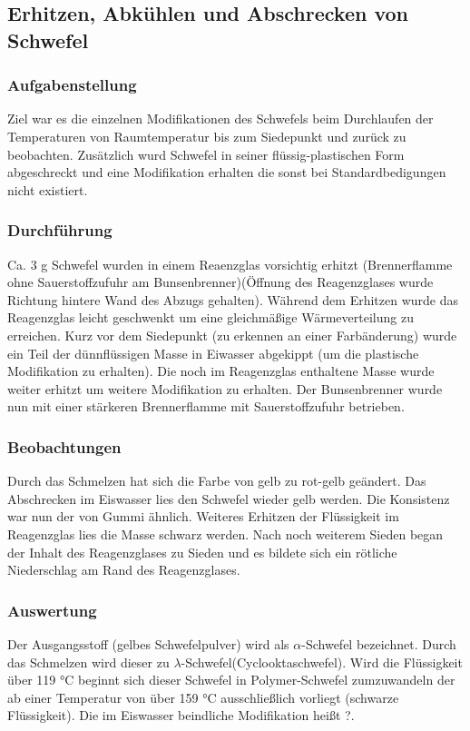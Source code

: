 \documentclass{scrartcl}
\begin{document}
\subsection{Erhitzen, Abkühlen und Abschrecken von Schwefel}
\subsubsection{Aufgabenstellung}
Ziel war es die einzelnen Modifikationen des Schwefels beim Durchlaufen der Temperaturen von Raumtemperatur bis zum Siedepunkt und zurück zu beobachten.
Zusätzlich wurd Schwefel in seiner flüssig-plastischen Form abgeschreckt und eine Modifikation erhalten die sonst bei Standardbedigungen nicht existiert.

\subsubsection{Durchführung}
Ca. 3 g Schwefel wurden in einem Reaenzglas vorsichtig erhitzt (Brennerflamme ohne Sauerstoffzufuhr am Bunsenbrenner)(Öffnung des Reagenzglases wurde Richtung hintere Wand des Abzugs gehalten). Während dem Erhitzen wurde das Reagenzglas leicht geschwenkt um eine gleichmäßige Wärmeverteilung zu erreichen. 
Kurz vor dem Siedepunkt (zu erkennen an einer Farbänderung) wurde ein Teil der dünnflüssigen Masse in Eiwasser abgekippt (um die plastische Modifikation zu erhalten). Die noch im Reagenzglas enthaltene Masse wurde weiter erhitzt um weitere Modifikation zu erhalten. Der Bunsenbrenner wurde nun mit einer stärkeren Brennerflamme mit Sauerstoffzufuhr betrieben.

\subsubsection{Beobachtungen}
Durch das Schmelzen hat sich die Farbe von gelb zu rot-gelb geändert. Das Abschrecken im Eiswasser lies den Schwefel wieder gelb werden. Die Konsistenz war nun der von Gummi ähnlich. Weiteres Erhitzen der Flüssigkeit im Reagenzglas lies die Masse schwarz werden. Nach noch weiterem Sieden began der Inhalt des Reagenzglases zu Sieden und es bildete sich ein rötliche Niederschlag am Rand des Reagenzglases.

\subsubsection{Auswertung}
Der Ausgangsstoff (gelbes Schwefelpulver) wird als $\alpha$-Schwefel bezeichnet. Durch das Schmelzen wird dieser zu $\lambda$-Schwefel(Cyclooktaschwefel).
Wird die Flüssigkeit über 119 °C beginnt sich dieser Schwefel in Polymer-Schwefel zumzuwandeln der ab einer Temperatur von über 159 °C ausschließlich vorliegt (schwarze Flüssigkeit).
Die im Eiswasser beindliche Modifikation heißt ?.
\end{document}
